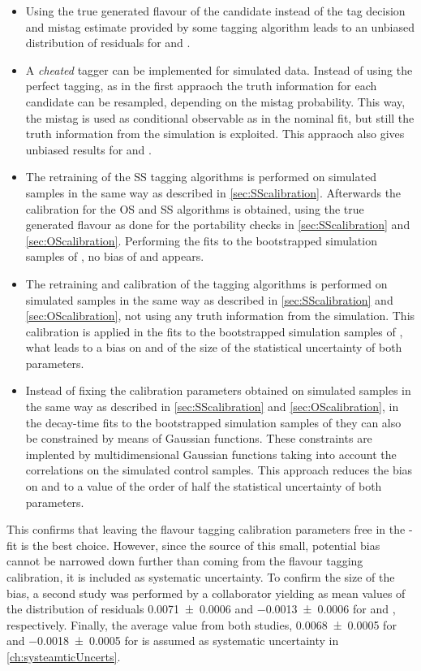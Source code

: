 \begin{itemize}
	\item Using the true generated flavour of the \B candidate instead of the tag decision and mistag estimate provided by some tagging algorithm leads to an unbiased distribution of residuals for \Sf and \Sfbar.
	\item A \emph{cheated} tagger can be implemented for simulated data.
	Instead of using the perfect tagging, as in the first appraoch the truth information for each candidate can be resampled, depending on the mistag probability.
	This way, the mistag is used as conditional observable as in the nominal fit, but still the truth information from the simulation is exploited.
	This appraoch also gives unbiased results for \Sf and \Sfbar.
	\item The retraining of the SS tagging algorithms is performed on simulated samples in the same way as described in \cref{sec:SScalibration}.
	Afterwards the calibration for the OS and SS algorithms is obtained, using the true generated flavour as done for the portability checks in \cref{sec:SScalibration} and \cref{sec:OScalibration}.
	Performing the fits to the bootstrapped simulation samples of \BdToDpi, no bias of \Sf and \Sfbar appears.
	\item The retraining and calibration of the tagging algorithms is performed on simulated samples in the same way as described in \cref{sec:SScalibration} and \cref{sec:OScalibration}, \ie not using any truth information from the simulation.
	This calibration is applied in the fits to the bootstrapped simulation samples of \BdToDpi, what leads to a bias on \Sf and \Sfbar of the size of the statistical uncertainty of both parameters.
	\item Instead of fixing the calibration parameters obtained on simulated samples in the same way as described in \cref{sec:SScalibration} and \cref{sec:OScalibration}, in the decay-time fits to the  bootstrapped simulation samples of \BdToDpi they can also be constrained by means of Gaussian functions.
	These constraints are implented by multidimensional Gaussian functions taking into account the correlations on the simulated control samples.
	This approach reduces the bias on \Sf and \Sfbar to a value of the order of half the statistical uncertainty of both parameters.
\end{itemize}
This confirms that leaving the flavour tagging calibration parameters free in the \CP-fit is the best choice.
However, since the source of this small, potential bias cannot be narrowed down further than coming from the flavour tagging calibration, it is included as systematic uncertainty.
To confirm the size of the bias, a second study was performed by a collaborator yielding as mean values of the distribution of residuals \num{0.0071\pm0.0006} and \num{-0.0013\pm0.0006} for \Sf and \Sfbar, respectively.
Finally, the average value from both studies, \ie \num{0.0068\pm0.0005} for \Sf and \num{-0.0018\pm0.0005} for \Sfbar is assumed as systematic uncertainty in \cref{ch:systeamticUncerts}.

